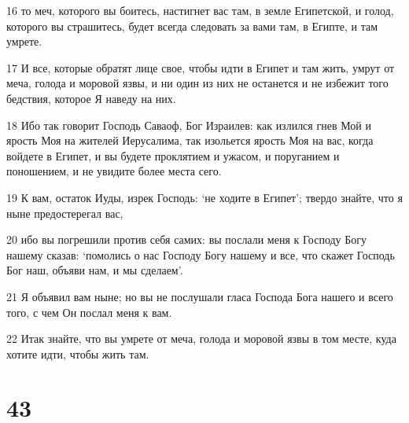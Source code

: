 \par 16 то меч, которого вы боитесь, настигнет вас там, в земле Египетской, и голод, которого вы страшитесь, будет всегда следовать за вами там, в Египте, и там умрете.
\par 17 И все, которые обратят лице свое, чтобы идти в Египет и там жить, умрут от меча, голода и моровой язвы, и ни один из них не останется и не избежит того бедствия, которое Я наведу на них.
\par 18 Ибо так говорит Господь Саваоф, Бог Израилев: как излился гнев Мой и ярость Моя на жителей Иерусалима, так изольется ярость Моя на вас, когда войдете в Египет, и вы будете проклятием и ужасом, и поруганием и поношением, и не увидите более места сего.
\par 19 К вам, остаток Иуды, изрек Господь: `не ходите в Египет'; твердо знайте, что я ныне предостерегал вас,
\par 20 ибо вы погрешили против себя самих: вы послали меня к Господу Богу нашему сказав: `помолись о нас Господу Богу нашему и все, что скажет Господь Бог наш, объяви нам, и мы сделаем'.
\par 21 Я объявил вам ныне; но вы не послушали гласа Господа Бога нашего и всего того, с чем Он послал меня к вам.
\par 22 Итак знайте, что вы умрете от меча, голода и моровой язвы в том месте, куда хотите идти, чтобы жить там.

\chapter{43}

